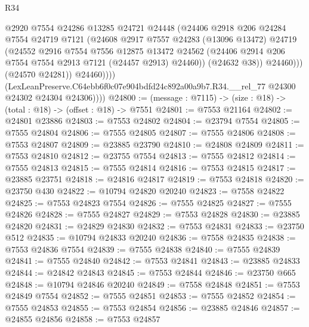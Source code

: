 \begin{lexlean}{R34}
\begin{coremodule}
                        @2920
                        @7554
                        @24286
                        @13285
                        @24721
                        @24448
                        (@24406
                          @2918
                          @206
                          @24284
                          @7554
                          @24719
                          @7121
                          (@24608
                            @2917
                            @7557
                            @24283
                            (@13096 @13472)
                            @24719
                            (@24552
                              @2916
                              @7554
                              @7556
                              @12875
                              @13472
                              @24562
                              (@24406 @2914 @206 @7554 @7554 @2913 @7121 (@24457 @2913) @24460))
                            (@24632 @38))
                          @24460)))
                    (@24570 @24281))
                  @24460))))
          (LexLeanPreserve.C64ebb6f0c07e904bdfd24c892a00a9b7.R34.__rel_77
            @24300
            @24302
            @24304
            @24306))))
@24800 := (message : @7115) -> (size : @18) -> (total : @18) -> (offset : @18) -> @7551
@24801 := @7553 @21164
@24802 := @24801 @23886
@24803 := @7553 @24802
@24804 := @23794 @7554
@24805 := @7555 @24804
@24806 := @7555 @24805
@24807 := @7555 @24806
@24808 := @7553 @24807
@24809 := @23885 @23790
@24810 := @24808 @24809
@24811 := @7553 @24810
@24812 := @23755 @7554
@24813 := @7555 @24812
@24814 := @7555 @24813
@24815 := @7555 @24814
@24816 := @7553 @24815
@24817 := @23885 @23751
@24818 := @24816 @24817
@24819 := @7553 @24818
@24820 := @23750 @430
@24822 := @10794 @24820 @20240
@24823 := @7558 @24822
@24825 := @7553 @24823 @7554
@24826 := @7555 @24825
@24827 := @7555 @24826
@24828 := @7555 @24827
@24829 := @7553 @24828
@24830 := @23885 @24820
@24831 := @24829 @24830
@24832 := @7553 @24831
@24833 := @23750 @512
@24835 := @10794 @24833 @20240
@24836 := @7558 @24835
@24838 := @7553 @24836 @7554
@24839 := @7555 @24838
@24840 := @7555 @24839
@24841 := @7555 @24840
@24842 := @7553 @24841
@24843 := @23885 @24833
@24844 := @24842 @24843
@24845 := @7553 @24844
@24846 := @23750 @665
@24848 := @10794 @24846 @20240
@24849 := @7558 @24848
@24851 := @7553 @24849 @7554
@24852 := @7555 @24851
@24853 := @7555 @24852
@24854 := @7555 @24853
@24855 := @7553 @24854
@24856 := @23885 @24846
@24857 := @24855 @24856
@24858 := @7553 @24857

\end{coremodule}
\end{lexlean}
